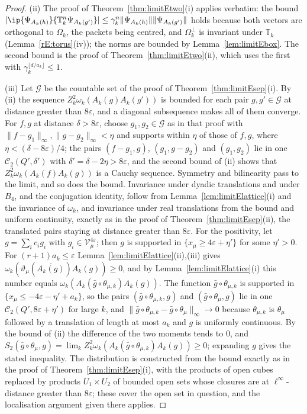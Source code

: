 \begin{proof}
(ii) The proof of Theorem~\ref{thm:limitEtwo}(i) applies verbatim: the
bound $|\ip{\Psi_{A_k(h)}}{\mathbb T_k^n\Psi_{A_k(g')}}|\le\gamma_k^n
\|\Psi_{A_k(h)}\|\|\Psi_{A_k(g')}\|$ holds because both vectors are
orthogonal to $\Omega_k$, the packets being centred, and $\Omega_k^\perp$ is
invariant under $\mathbb T_k$ (Lemma~\ref{rE:torus}(iv)); the norms are
bounded by Lemma~\ref{lem:limitEbox}. The second bound is the proof of
Theorem~\ref{thm:limitEtwo}(ii), which uses the first with $\gamma_k^{\lfloor
d/a_k\rfloor}\le1$.

(iii) Let $\mathcal G$ be the countable set of the proof of
Theorem~\ref{thm:limitEsep}(i). By (ii) the sequence $Z_k^2\omega_k(A_k(g)
A_k(g'))$ is bounded for each pair $g,g'\in\mathcal G$ at distance greater
than $8\varepsilon$, and a diagonal subsequence makes all of them converge.
For $f,g$ at distance $\delta>8\varepsilon$, choose $g_1,g_2\in\mathcal G$
as in that proof with $\|f-g_1\|_\infty,\|g-g_2\|_\infty<\eta$ and supports
within $\eta$ of those of $f,g$, where $\eta<(\delta-8\varepsilon)/4$; the
pairs $(f-g_1,g)$, $(g_1,g-g_2)$ and $(g_1,g_2)$ lie in one $\mathcal C_2(Q',
\delta')$ with $\delta'=\delta-2\eta>8\varepsilon$, and the second bound of
(ii) shows that $Z_k^2\omega_k(A_k(f)A_k(g))$ is a Cauchy sequence. Symmetry
and bilinearity pass to the limit, and so does the bound. Invariance under
dyadic translations and under $B_4$, and the conjugation identity, follow
from Lemma~\ref{lem:limitElattice}(i) and the invariance of $\omega_k$, and
invariance under real translations from the bound and uniform continuity,
exactly as in the proof of Theorem~\ref{thm:limitEsep}(ii), the translated
pairs staying at distance greater than $8\varepsilon$. For the positivity,
let $g=\sum_ic_ig_i$ with $g_i\in\mathcal V^{4\varepsilon}_\mu$; then
$g$ is supported in $\{x_\mu\ge4\varepsilon+\eta'\}$ for some $\eta'>0$. For
$(r+1)a_k\le\varepsilon$ Lemma~\ref{lem:limitElattice}(ii),(iii) gives
$\omega_k(\vartheta_\mu(\overline{A_k(g)})A_k(g))\ge0$, and by
Lemma~\ref{lem:limitElattice}(i) this number equals $\omega_k(A_k(\bar g
\circ\theta_{\mu,k})A_k(g))$. The function $\bar g\circ\theta_{\mu,k}$ is
supported in $\{x_\mu\le-4\varepsilon-\eta'+a_k\}$, so the pairs
$(\bar g\circ\theta_{\mu,k},g)$ and $(\bar g\circ\theta_\mu,g)$ lie in one
$\mathcal C_2(Q',8\varepsilon+\eta')$ for large $k$, and $\|\bar g\circ
\theta_{\mu,k}-\bar g\circ\theta_\mu\|_\infty\to0$ because $\theta_{\mu,k}$
is $\theta_\mu$ followed by a translation of length at most $a_k$ and $g$ is
uniformly continuous. By the bound of (ii) the difference of the two moments
tends to $0$, and $S_2(\bar g\circ\theta_\mu,g)=\lim_kZ_k^2\omega_k(A_k(\bar
g\circ\theta_{\mu,k})A_k(g))\ge0$; expanding $g$ gives the stated
inequality. The distribution is constructed from the bound exactly as in the
proof of Theorem~\ref{thm:limitEsep}(i), with the products of open cubes
replaced by products $U_1\times U_2$ of bounded open sets whose closures are
at $\ell^\infty$-distance greater than $8\varepsilon$; these cover the open
set in question, and the localisation argument given there applies.


\end{proof}
